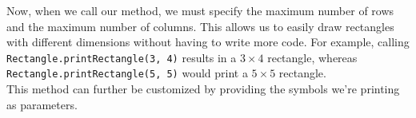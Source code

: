 Now, when we call our method, we must specify the maximum number of rows and the maximum number of columns. This allows us to easily draw rectangles with different dimensions without having to write more code. For example, calling \verb!Rectangle.printRectangle(3, 4)! results in a $3\times 4$ rectangle, whereas \verb!Rectangle.printRectangle(5, 5)! would print a $5\times 5$ rectangle.  \\

This method can further be customized by providing the symbols we're printing as parameters.




\iffalse
\subsection{More on Nested Loops}

Previously, we saw how we can use nested for-loops to draw designs. We ended last lecture with an example that prints out a triangle. However, the triangle was left-adjusted. How can we make the triangle centered?


This problem can still be solved with a nested for-loop. However, the key observation is that the number of spaces is equal the maximum number of columns minus the current row number:





\begin{lstlisting}
public class Triangle2 {
    public static void main(String args[]) {
        
    }

}
\end{lstlisting}
\fi